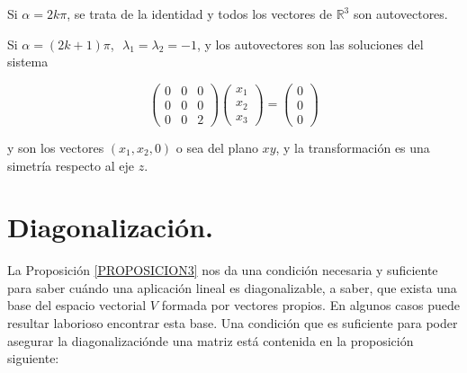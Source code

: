 \begin{example}
\bigskip

Si $ \alpha = 2k \pi $, se trata de la identidad y todos los vectores de $ \mathbb{R}^3$ son autovectores.

\bigskip

Si $ \alpha = (2k+1) \pi $, $ $ $\lambda_1=\lambda_2= -1$, y los autovectores son las soluciones del sistema 

\bigskip

$$\left(\begin{array}{ccc} 0 & 0&  0 \\ 0 & 0 & 0
\\ 0 & 0 & 2
\end{array}
 \right)  \left(\begin{array}{c} x_1\\ x_2
\\ x_3
\end{array}
 \right) =  \left(\begin{array}{c} 0\\ 0
\\ 0
\end{array}
 \right)$$
 
\bigskip
\noindent
y son los vectores  $ (x_1, x_2,0)$ o sea del plano $xy$, y la transformación es una simetría respecto al eje $z$.

\end{example}

\bigskip



\section{Diagonalización.}
\label{diago}

La Proposición \ref{PROPOSICION3} nos da una condición necesaria y suficiente para saber cuándo una aplicación lineal es diagonalizable, a saber, que exista una base del espacio vectorial $V$ formada por vectores propios. En algunos casos puede resultar laborioso encontrar esta base. Una condición que es suficiente para poder asegurar la diagonalizaciónde una matriz está contenida en la proposición siguiente:



\bigskip


